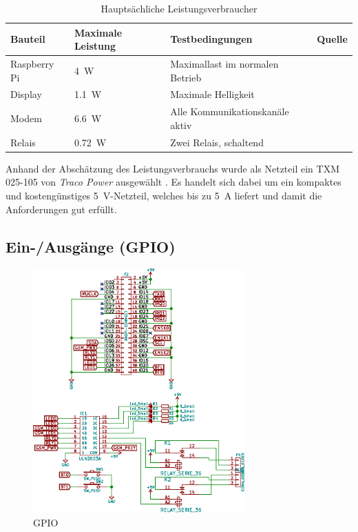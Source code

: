 \begin{table}[h!tb]
    \caption{Haupts\"achliche Leistungsverbraucher}
    \label{tab:hw:master:supply:consumption}
    \small
    \begin{tabular}{llll}
        \toprule
        \textbf{Bauteil} & \textbf{Maximale Leistung} & \textbf{Testbedingungen} & \textbf{Quelle} \\
        \midrule
        Raspberry Pi & \SI{4}{W}    & Maximallast im normalen Betrieb  & \cite{ref:raspipower} \\
        Display      & \SI{1.1}{W}  & Maximale Helligkeit              & \cite{datasheet:display} \\
        Modem        & \SI{6.6}{W}  & Alle Kommunikationskan\"ale aktiv  & \cite{ref:modemrefdesign} \\
        Relais       & \SI{0.72}{W} & Zwei Relais, schaltend           & \cite{datasheet:finder36relais} \\
        \bottomrule
    \end{tabular}
\end{table}

Anhand  der  Absch\"atzung  des  Leistungsverbrauchs wurde  als  Netzteil  ein
TXM  025-105  von   \emph{Traco  Power}  ausgew\"ahlt  \cite{ref:farnell:psu}.
Es   handelt    sich   dabei   um   ein    kompaktes   und   kosteng\"unstiges
\SI{5}{\volt}-Netzteil, welches  bis zu \SI{5}{\ampere} liefert  und damit die
Anforderungen gut erf\"ullt.


\subsection{Ein-/Ausg\"ange (GPIO)}
\label{subsec:hw:master:gpio}

\begin{figure}[h!t]
    \centering
    \includegraphics[width=0.725\textwidth]{images/superv-sch/supervisor--sch--gpio.eps}
    \caption[\Master: Schema GPIO]{GPIO \Master}
    \label{fig:sch:master:gpio}
\end{figure}

